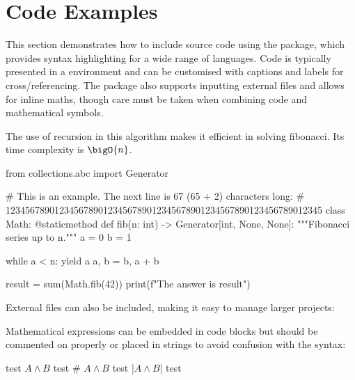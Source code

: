 \section{Code Examples}

This section demonstrates how to include source code using the  package, which provides syntax highlighting for a wide range of languages. Code is typically presented in a  environment and can be customised with captions and labels for cross\-/referencing. The  package also supports inputting external files and allows for inline maths, though care must be taken when combining code and mathematical symbols.

The use of \gls{recursion} in this algorithm makes it efficient in solving \gls{fibonacci}. Its time \gls{complexity} is $\bigO{n}$.

\begin{listing}[H]
    \begin{pythoncode}
from collections.abc import Generator

# This is an example. The next line is 67 (65 + 2) characters long:
# 12345678901234567890123456789012345678901234567890123456789012345
class Math:
    @staticmethod
    def fib(n: int) -> Generator[int, None, None]:
        """Fibonacci series up to n."""
        a = 0
        b = 1

        while a < n:
            yield a
            a, b = b, a + b

result = sum(Math.fib(42))
print(f"The answer is {result}")
    \end{pythoncode}
    \caption{Python implementation of the Fibonacci sequence.}
    \label{lst:fibonacci}
\end{listing}

External files can also be included, making it easy to manage larger projects:

\begin{listing}[H]
    \caption{A simple MATLAB programme.}
    \label{lst:matlabHelloWorld}
\end{listing}

Mathematical expressions can be embedded in code blocks but should be commented on properly or placed in strings to avoid confusion with the syntax:

\begin{listing}[H]
    \begin{pythoncode}
test
$A \wedge B$
test
# $A \wedge B$
test
|$A \wedge B$|
test
    \end{pythoncode}
    \caption{Using math inside  environments.}
    \label{lst:mathMinted}
\end{listing}

